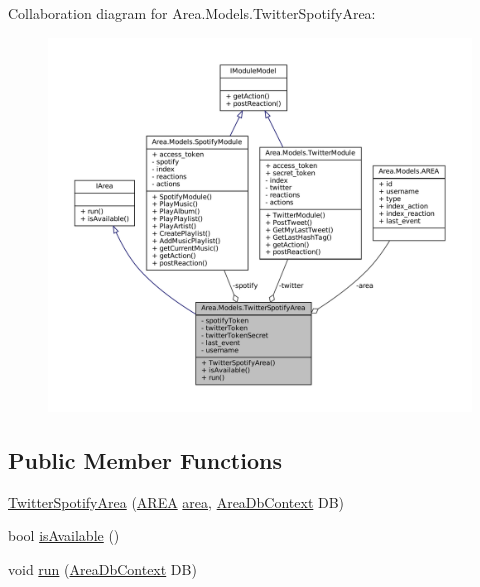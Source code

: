 Collaboration diagram for Area.\+Models.\+Twitter\+Spotify\+Area\+:
\nopagebreak
\begin{figure}[H]
\begin{center}
\leavevmode
\includegraphics[width=350pt]{classArea_1_1Models_1_1TwitterSpotifyArea__coll__graph}
\end{center}
\end{figure}
\subsection*{Public Member Functions}
\begin{DoxyCompactItemize}
\item 
\mbox{\hyperlink{classArea_1_1Models_1_1TwitterSpotifyArea_a48e34b1cad5cc6e5049972bdcccfe385}{Twitter\+Spotify\+Area}} (\mbox{\hyperlink{classArea_1_1Models_1_1AREA}{A\+R\+EA}} \mbox{\hyperlink{classArea_1_1Models_1_1TwitterSpotifyArea_a85693ce9a136d23f93e0ed9d5802846c}{area}}, \mbox{\hyperlink{classArea_1_1DAT_1_1AreaDbContext}{Area\+Db\+Context}} DB)
\item 
bool \mbox{\hyperlink{classArea_1_1Models_1_1TwitterSpotifyArea_a0a58941ea11c4ec34da9319efc4eb6d3}{is\+Available}} ()
\item 
void \mbox{\hyperlink{classArea_1_1Models_1_1TwitterSpotifyArea_a6ff9d29fc453210f86a59959c89848c4}{run}} (\mbox{\hyperlink{classArea_1_1DAT_1_1AreaDbContext}{Area\+Db\+Context}} DB)
\end{DoxyCompactItemize}
